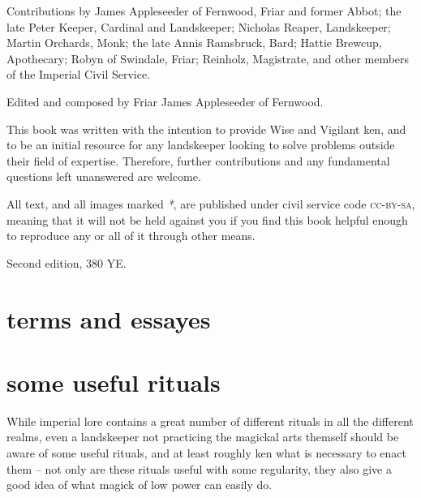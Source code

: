 \documentclass[twoside,fontsize=9pt,a5paper]{scrbook}
\begin{document}
\begin{uppertitleback}{}
Contributions by James Appleseeder of Fernwood, Friar and former Abbot; the late Peter Keeper, Cardinal and Lands\-keeper; Nicholas Reaper, Lands\-keeper; Martin Orchards, Monk; the late Annis Ramsbruck, Bard; Hattie Brewcup, Apothecary; Robyn of Swindale, Friar; Reinholz, Magistrate, and other members of the Imperial Civil Service.

Edited and composed by Friar James Appleseeder of Fernwood.

This book was written with the intention to provide Wise and Vigilant ken, and to be an initial resource for any landskeeper looking to solve problems outside their field of expertise. Therefore, further contributions and any fundamental questions left unanswered are welcome.

All text, and all images marked \textit{*}, are published under civil service code \textsc{cc-by-sa}, meaning that it will not be held against you if you find this book helpful enough to reproduce any or all of it through other means. 

Second edition, 380 YE.
\end{uppertitleback}
\setlength{\parindent}{1em}

\begingroup
\tableofcontents
\let\cleardoublepage\clearpage
\listoftables
\endgroup

\chapter{terms and essayes}
\pagestyle{scrheadings}
\thispagestyle{scrheadings}
\begin{multicols}{2}

\end{multicols}

\chapter{some useful rituals}
\thispagestyle{scrheadings}
\label{appendix}
While imperial lore contains a great number of different rituals in all the different realms, even a landskeeper not practicing the magickal arts themself should be aware of some useful rituals, and at least roughly ken what is necessary to enact them – not only are these rituals useful with some regularity, they also give a good idea of what magick of low power can easily do.
\end{document}
